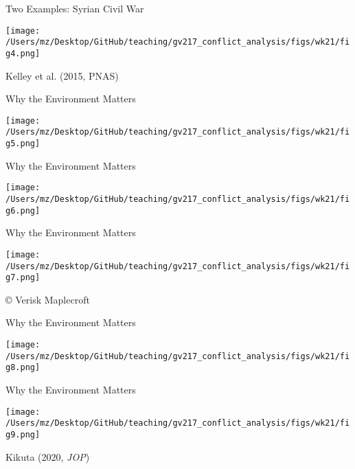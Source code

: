 \documentclass{beamer}
\begin{document}
\begin{frame}{Two Examples: Syrian Civil War}
    \pause
    \begin{center}
        \texttt{[image: /Users/mz/Desktop/GitHub/teaching/gv217\_conflict\_analysis/figs/wk21/fig4.png]}
    \end{center}
    \tiny Kelley et al. (2015, PNAS) 
\end{frame}

\begin{frame}{Why the Environment Matters}
    \pause
    \begin{center}
        \texttt{[image: /Users/mz/Desktop/GitHub/teaching/gv217\_conflict\_analysis/figs/wk21/fig5.png]}
    \end{center}
\end{frame}

\begin{frame}{Why the Environment Matters}
    \pause
    \begin{center}
        \texttt{[image: /Users/mz/Desktop/GitHub/teaching/gv217\_conflict\_analysis/figs/wk21/fig6.png]}
    \end{center}
\end{frame}

\begin{frame}{Why the Environment Matters}
    \pause
    \begin{center}
        \texttt{[image: /Users/mz/Desktop/GitHub/teaching/gv217\_conflict\_analysis/figs/wk21/fig7.png]}
    \end{center}
    \tiny © Verisk Maplecroft
\end{frame}

\begin{frame}{Why the Environment Matters}
    \pause
    \begin{center}
        \texttt{[image: /Users/mz/Desktop/GitHub/teaching/gv217\_conflict\_analysis/figs/wk21/fig8.png]}
    \end{center}
\end{frame}

\begin{frame}{Why the Environment Matters}
    \pause
    \begin{center}
        \texttt{[image: /Users/mz/Desktop/GitHub/teaching/gv217\_conflict\_analysis/figs/wk21/fig9.png]}
    \end{center}
    \tiny Kikuta (2020, \emph{JOP})
\end{frame}
\end{document}
